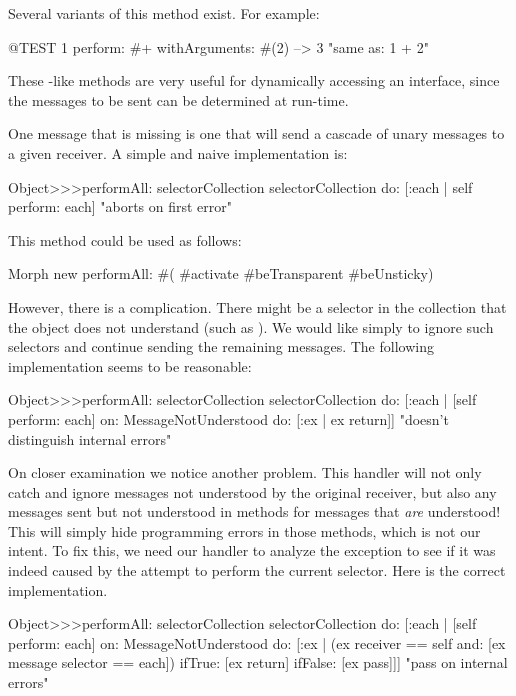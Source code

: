 \documentclass[a4paper,10pt,twoside]{book}
\begin{document}
Several variants of this method exist. For example:
\begin{code}{@TEST}
1 perform: #+ withArguments: #(2) --> 3    "same as: 1 + 2"
\end{code}
These -like methods are very useful for dynamically accessing an interface, since the messages to be sent can be determined at run-time.

One message that is missing is one that will send a cascade of unary messages to a given receiver. A simple and naive implementation is:
\begin{code}{}
Object>>>performAll: selectorCollection
	selectorCollection do: [:each | self perform: each]    "aborts on first error"
\end{code}

This method could be used as follows:
\begin{code}{}
Morph new performAll: #( #activate #beTransparent #beUnsticky)
\end{code}

However, there is a complication. There might be a selector in the collection that the object does not understand (such as ). We would like simply to ignore such selectors and continue sending the remaining messages. The following implementation seems to be reasonable:

\begin{code}{}
Object>>>performAll: selectorCollection 
	selectorCollection do: [:each |
		[self perform: each]
			on: MessageNotUnderstood
			do: [:ex | ex return]]    "doesn't distinguish internal errors"
\end{code}

On closer examination we notice another problem. This handler will not only catch and ignore messages not understood by the original receiver, but also any messages sent but not understood in methods for messages that \emph{are} understood! This will simply hide programming errors in those methods, which is not our intent.
To fix this, we need our handler to analyze the exception to see if it was indeed caused by the attempt to perform the current selector.
Here is the correct implementation.
\begin{code}{}
Object>>>performAll: selectorCollection 
	selectorCollection do: [:each | 
		[self perform: each] 
			on: MessageNotUnderstood 
			do: [:ex | (ex receiver == self and: [ex message selector == each]) 
				ifTrue: [ex return] 
				ifFalse: [ex pass]]]    "pass on internal errors"
\end{code}
\end{document}

